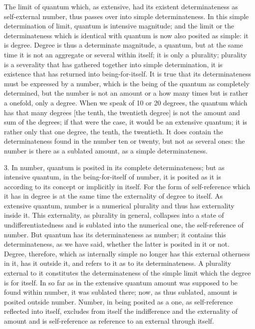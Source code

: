 The limit of quantum which, as extensive,
had its existent determinateness as self-external number,
thus passes over into simple determinateness.
In this simple determination of limit,
quantum is intensive magnitude;
and the limit or the determinateness
which is identical with quantum is now
also posited as simple: it is degree.
Degree is thus a determinate magnitude, a quantum,
but at the same time it is not an aggregate
or several within itself;
it is only a plurality;
plurality is a severality that has gathered
together into simple determination,
it is existence that has returned into being-for-itself.
It is true that its determinateness must be expressed by a number,
which is the being of the quantum as completely determined,
but the number is not an amount or a how many times
but is rather a onefold, only a degree.
When we speak of 10 or 20 degrees,
the quantum which has that many degrees
[the tenth, the twentieth degree]
is not the amount and sum of the degrees;
if that were the case, it would be an extensive quantum;
it is rather only that one degree, the tenth, the twentieth.
It does contain the determinateness found in
the number ten or twenty,
but not as several ones:
the number is there as a sublated amount,
as a simple determinateness.

3. In number, quantum is posited in its complete determinateness;
but as intensive quantum, in the being-for-itself of number,
it is posited as it is according to its concept or implicitly in itself.
For the form of self-reference which it has in degree is
at the same time the externality of degree to itself.
As extensive quantum, number is a numerical plurality
and thus has externality inside it.
This externality, as plurality in general,
collapses into a state of undifferentiatedness
and is sublated into the numerical one,
the self-reference of number.
But quantum has its determinateness as number;
it contains this determinateness, as we have said,
whether the latter is posited in it or not.
Degree, therefore, which as internally simple no
longer has this external otherness in it, has it outside it,
and refers to it as to its determinateness.
A plurality external to it constitutes the determinateness
of the simple limit which the degree is for itself.
In so far as in the extensive quantum
amount was supposed to be found within number,
it was sublated there;
now, as thus sublated, amount is posited outside number.
Number, in being posited as a one,
as self-reference reflected into itself,
excludes from itself the indifference and the externality of amount
and is self-reference as reference to an external through itself.

